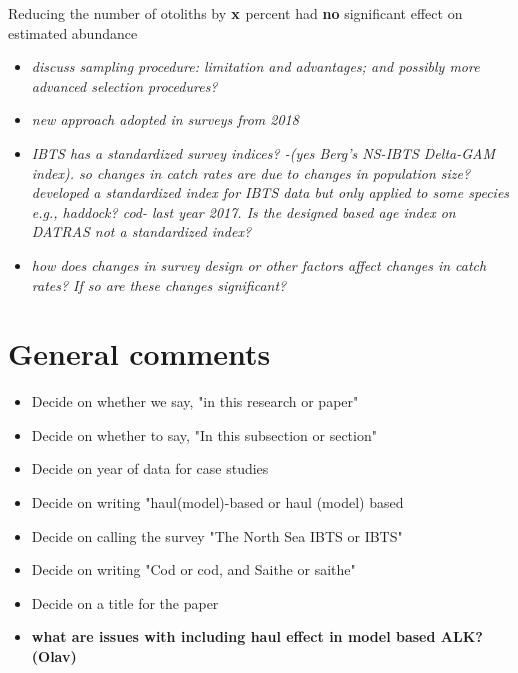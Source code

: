 \documentclass[a4paper 12pt]{article}
\numberwithin{equation}{section}
\begin{document}
Reducing the number of otoliths by ${\bf x}$ percent had {\bf no} significant effect on estimated abundance
\begin{itemize}
\item \emph{discuss sampling procedure: limitation and advantages; and possibly more advanced selection procedures? }
\item \emph{new approach adopted in surveys from 2018 }
\item \emph{IBTS has a standardized survey indices? -(yes Berg's NS-IBTS Delta-GAM index).  so changes in catch rates are due to changes in population size? \citet{berg2014evaluation} developed a standardized index for IBTS data but only applied to some species e.g., haddock? cod- last year 2017. Is the designed based age index on DATRAS not a standardized index?}
\item \emph{how does changes in survey design or other factors affect changes in catch rates? If so are these changes  significant? }
\end{itemize}


\section{General comments}

\begin{itemize}
\item Decide on whether we say, "in this research or paper"
\item Decide on whether to say, "In this subsection or section"
\item Decide on year of data for case studies
\item Decide on writing "haul(model)-based or haul (model) based
\item Decide on calling the survey "The North Sea IBTS or IBTS"
\item Decide on writing "Cod or cod, and Saithe or saithe"
\item Decide on a title for the paper
\item {\bf what are issues with including haul effect in model based ALK?
 (Olav)}
 
\end{itemize}

\clearpage
\end{document}

